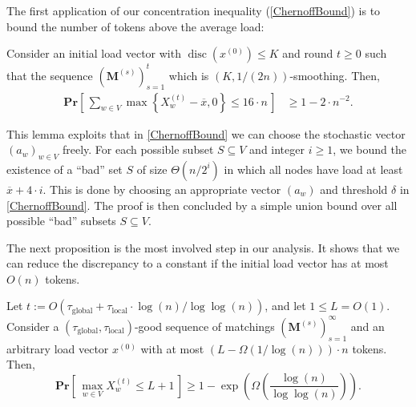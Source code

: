 \documentclass[twoside,leqno]{article}
\newcommand{\Pro}[1]{\mathbf{Pr} \left[\,#1\,\right]}
\newcommand{\M}{\mathbf{M}}
\newcommand{\xbar}{\ensuremath{\overline{x}}}
\DeclareMathOperator{\discr}{\mathrm{disc}}
\DeclareMathOperator{\1}{\mathbf{1}}
\newcommand{\taulocal}{\tau_{\mathrm{local}}}
\newcommand{\tauglobal}{\tau_{\mathrm{global}}}
\numberwithin{equation}{section}
\newcommand{\newL}{L}
\begin{document}
The first application of our concentration inequality (\cref{ChernoffBound}) is to bound the number of tokens above the average load:
\begin{lemma}
Consider an initial load vector with $\discr(x^{(0)})\le K$ and round $t \geq 0$ such that the sequence $\left(\M^{(s)}\right)_{s=1}^{t}$ which is
$(K, 1/(2n))$-smoothing. Then,
\begin{align*}
\Pro{ \sum_{w \in V} \max \left\{ X_w^{(t)} - \overline{x}, 0 \right\} \leq 16 \cdot n }&\geq 1-2\cdot n^{-2}.
\end{align*}
\end{lemma}
This lemma exploits that in \cref{ChernoffBound} we can choose the stochastic vector $(a_w)_{w \in V}$ freely. For each possible subset $S \subseteq V$ and integer $i \geq 1$, we bound the existence of a ``bad'' set $S$ of size $\Theta(n / 2^{i})$ in which all nodes have load at least $\xbar+4 \cdot i$. This is done by choosing an appropriate vector $(a_w)$ and threshold $\delta$ in \cref{ChernoffBound}. The proof is then concluded by a simple union bound over all possible ``bad'' subsets $S \subseteq V$.

The next proposition is the most involved step in our analysis. It shows that we can reduce the discrepancy to a constant if the initial load vector has at most $O(n)$ tokens.
\begin{proposition}
Let $t :=O( \tauglobal + \taulocal \cdot \log (n)/\log\log(n))$, and let $1 \leq L =O(1)$. Consider a $(\tauglobal,\taulocal)$-good sequence of matchings $\left(\M^{(s)}\right)_{s=1}^{\infty}$ and an arbitrary load vector $x^{(0)}$ with at most $( L-\Omega(1/\log (n))) \cdot n$ tokens.
Then,
\[
\Pro{ \max_{w \in V}X_w^{(t)} \leq \newL+1 }  
\geq 1-\exp\left( \Omega\left( \frac{\log(n)}{\log \log(n)} \right) \right).
\]
\end{proposition}
\end{document}
